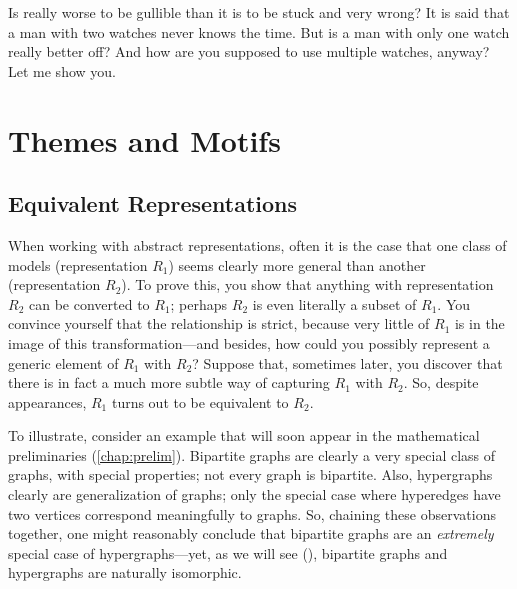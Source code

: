 %
Is really worse to be gullible than it is to be stuck and very wrong? 
It is said that a man with two watches never knows the time.  
But is a man with only one watch really better off?
And how are you supposed to use multiple watches, anyway?
Let me show you. 


\section{Themes and Motifs}



%
\subsection{Equivalent Representations}

When working with abstract representations, often it is the case that one class of models (representation $R_1$) seems clearly more general than another (representation $R_2$).
To prove this, you show that anything with representation $R_2$ can be converted to $R_1$; perhaps $R_2$ is even literally a subset of $R_1$. 
You convince yourself that the relationship is strict, because very little of $R_1$ is in the image of this transformation---and besides, how could you possibly represent a generic element of $R_1$ with $R_2$? 
Suppose that, sometimes later,
 you discover that there is in fact a much more subtle way of capturing $R_1$ with $R_2$. 
So, despite appearances, $R_1$ turns out to be equivalent to $R_2$. 

To illustrate, consider an example that will soon appear in the mathematical preliminaries (\cref{chap:prelim}). 
Bipartite graphs are clearly a very special class of graphs, with special properties; not every graph is bipartite. 
Also, hypergraphs clearly are generalization of graphs; only the special case where hyperedges have two vertices correspond meaningfully to graphs. 
So, chaining these observations together, one might reasonably conclude that bipartite graphs are an \emph{extremely} special case of hypergraphs---yet, as we will see (), bipartite graphs and hypergraphs are naturally isomorphic. 




